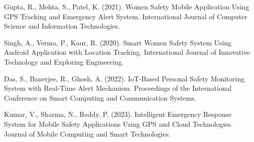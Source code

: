 \documentclass[a4paper,12pt]{report}
\begin{document}
\begin{enumerate}[label={[\arabic*]}, leftmargin=1.5cm]
\item Gupta, R., Mehta, S., Patel, K. (2021). Women Safety Mobile Application Using GPS Tracking and Emergency Alert System. International Journal of Computer Science and Information Technologies.

\item Singh, A., Verma, P., Kaur, R. (2020). Smart Women Safety System Using Android Application with Location Tracking. International Journal of Innovative Technology and Exploring Engineering.

\item Das, S., Banerjee, R., Ghosh, A. (2022). IoT-Based Personal Safety Monitoring System with Real-Time Alert Mechanism. Proceedings of the International Conference on Smart Computing and Communication Systems.

\item Kumar, V., Sharma, N., Reddy, P. (2023). Intelligent Emergency Response System for Mobile Safety Applications Using GPS and Cloud Technologies. Journal of Mobile Computing and Smart Technologies.

\end{enumerate}
\end{document}
